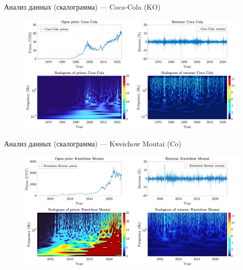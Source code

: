 \documentclass[11pt, aspectratio= 169]{beamer}
\begin{document}

	\begin{frame}{Анализ данных (скалограмма) --- Coca-Cola (KO)}
		\begin{figure}[H]
			\includegraphics[width= 14cm]{scalogram_insights_us.png}
		\end{figure}
	\end{frame}

	\begin{frame}{Анализ данных (скалограмма) --- Kweichow Moutai (Co)}
		\begin{figure}[H]
			\includegraphics[width= 14cm]{scalogram_insights_china.png}
		\end{figure}
	\end{frame}
\end{document}
